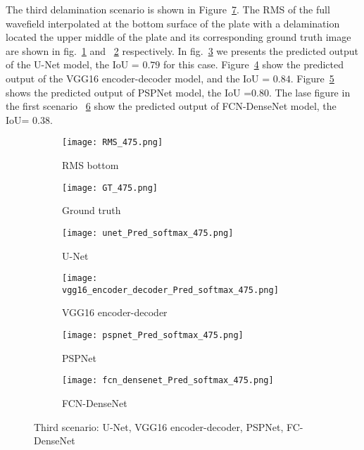 The third delamination scenario is shown in Figure~\ref{fig:475_softmax}. 
The RMS of the full wavefield interpolated at the bottom surface of the plate with a delamination located the upper middle  of the plate and its corresponding ground truth image are shown in fig.~\ref{fig:RMS_flat_shell_Vz_475} and ~\ref{fig:m1_rand_single_delam_475} respectively. 
In fig.~\ref{fig:Unet_Pred__softmax_475} we presents the predicted output of the U-Net model, the IoU = \(0.79\) for this case.
Figure~\ref{fig:vgg16_pred__softmax_475} show the predicted output of the VGG16 encoder-decoder model, and the IoU = \(0.84\). 
Figure~\ref{fig:pspnet_pred__softmax_475} shows the predicted output of PSPNet model, the IoU =\(0.80\).
The lase figure in the first scenario ~\ref{fig:fcn_densenet_pred__softmax_475}	show the predicted output of FCN-DenseNet model, the IoU= \(0.38\).
\begin{figure}[!h]
	\centering
	\begin{subfigure}[b]{0.47\textwidth}
		\centering
		\texttt{[image: RMS\_475.png]}
		\caption{RMS bottom}
		\label{fig:RMS_flat_shell_Vz_475}
	\end{subfigure}
	\hfill
	\begin{subfigure}[b]{0.47\textwidth}
		\centering
		\texttt{[image: GT\_475.png]}
		\caption{Ground truth}
		\label{fig:m1_rand_single_delam_475}
	\end{subfigure}
	\begin{subfigure}[b]{0.47\textwidth}
		\centering
		\texttt{[image: unet\_Pred\_softmax\_475.png]}
		\caption{U-Net}
		\label{fig:Unet_Pred__softmax_475}
	\end{subfigure}
	\hfill
	\begin{subfigure}[b]{0.47\textwidth}
		\centering
		\texttt{[image: vgg16\_encoder\_decoder\_Pred\_softmax\_475.png]}
		\caption{VGG16 encoder-decoder}			\label{fig:vgg16_pred__softmax_475}			
	\end{subfigure}
	\hfill
	\begin{subfigure}[b]{0.47\textwidth}
		\centering
		\texttt{[image: pspnet\_Pred\_softmax\_475.png]}
		\caption{PSPNet}
		\label{fig:pspnet_pred__softmax_475}
	\end{subfigure}	
	\hfill
	\begin{subfigure}[b]{0.47\textwidth}
		\centering
		\texttt{[image: fcn\_densenet\_Pred\_softmax\_475.png]}
		\caption{FCN-DenseNet}
		\label{fig:fcn_densenet_pred__softmax_475}
	\end{subfigure}	
	\caption{Third scenario: U-Net, VGG16 encoder-decoder, PSPNet, FC-DenseNet}
	\label{fig:475_softmax}
\end{figure}

